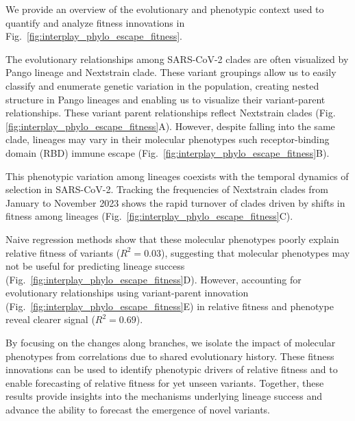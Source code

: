 We provide an overview of the evolutionary and phenotypic context used to quantify and analyze fitness innovations in Fig.~\ref{fig:interplay_phylo_escape_fitness}.

The evolutionary relationships among SARS-CoV-2 clades are often visualized by Pango lineage and Nextstrain clade.
These variant groupings allow us to easily classify and enumerate genetic variation in the population, creating nested structure in Pango lineages and enabling us to visualize their variant-parent relationships.
These variant parent relationships reflect Nextstrain clades (Fig. \ref{fig:interplay_phylo_escape_fitness}A).
However, despite falling into the same clade, lineages may vary in their molecular phenotypes such receptor-binding domain (RBD) immune escape (Fig.~\ref{fig:interplay_phylo_escape_fitness}B). 

This phenotypic variation among lineages coexists with the temporal dynamics of selection in SARS-CoV-2.
Tracking the frequencies of Nextstrain clades from January to November 2023 shows the rapid turnover of clades driven by shifts in fitness among lineages (Fig.~\ref{fig:interplay_phylo_escape_fitness}C).

Naive regression methods show that these molecular phenotypes poorly explain relative fitness of variants ($R^2 = 0.03$), suggesting that molecular phenotypes may not be useful for predicting lineage success (Fig.~\ref{fig:interplay_phylo_escape_fitness}D).
However, accounting for evolutionary relationships using variant-parent innovation (Fig.~\ref{fig:interplay_phylo_escape_fitness}E) in relative fitness and phenotype reveal clearer signal ($R^2 = 0.69$).

By focusing on the changes along branches, we isolate the impact of molecular phenotypes from correlations due to shared evolutionary history.
These fitness innovations can be used to identify phenotypic drivers of relative fitness and to enable forecasting of relative fitness for yet unseen variants.
Together, these results provide insights into the mechanisms underlying lineage success and advance the ability to forecast the emergence of novel variants.

